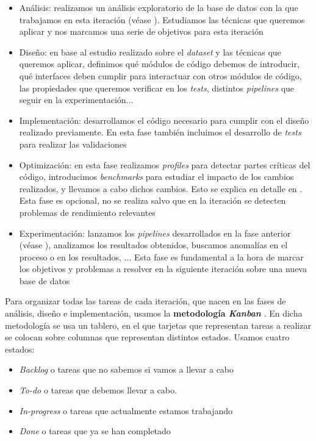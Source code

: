 \begin{itemize}
    \item Análisis: realizamos un análisis exploratorio de la base de datos con la que trabajamos en esta iteración (véase ). Estudiamos las técnicas que queremos aplicar y nos marcamos una serie de objetivos para esta iteración
    \item Diseño: en base al estudio realizado sobre el \textit{dataset} y las técnicas que queremos aplicar, definimos qué módulos de código debemos de introducir, qué interfaces deben cumplir para interactuar con otros módulos de código, las propiedades que queremos verificar en los \textit{tests}, distintos \textit{pipelines} que seguir en la experimentación...
    \item Implementación: desarrollamos el código necesario para cumplir con el diseño realizado previamente. En esta fase también incluimos el desarrollo de \textit{tests} para realizar las validaciones
    \item Optimización: en esta fase realizamos \textit{profiles} para detectar partes críticas del código, introducimos \textit{benchmarks} para estudiar el impacto de los cambios realizados, y llevamos a cabo dichos cambios. Esto se explica en detalle en . Esta fase es opcional, no se realiza salvo que en la iteración se detecten problemas de rendimiento relevantes
    \item Experimentación: lanzamos los \textit{pipelines} desarrollados en la fase anterior (véase ), analizamos los resultados obtenidos, buscamos anomalías en el proceso o en los resultados, ... Esta fase es fundamental a la hora de marcar los objetivos y problemas a resolver en la siguiente iteración sobre una nueva base de datos
\end{itemize}

Para organizar todas las tareas de cada iteración, que nacen en las fases de análisis, diseño e implementación, usamos la \textbf{metodología \textit{Kanban}} \cite{informatica:kanban_paper}. En dicha metodología se usa un tablero, en el que tarjetas que representan tareas a realizar se colocan sobre columnas que representan distintos estados. Usamos cuatro estados:

\begin{itemize}
    \item \textit{Backlog} o tareas que no sabemos si vamos a llevar a cabo
    \item \textit{To-do} o tareas que debemos llevar a cabo.
    \item \textit{In-progress} o tareas que actualmente estamos trabajando
    \item \textit{Done} o tareas que ya se han completado
\end{itemize}

